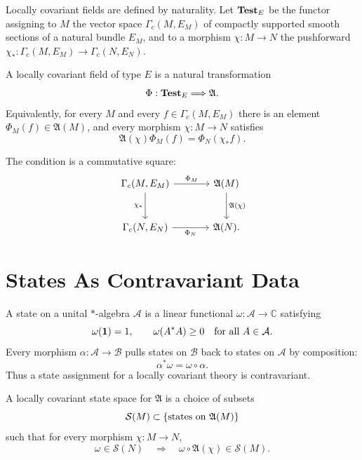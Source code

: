 Locally covariant fields are defined by naturality.  Let
\({\bf Test}_E\) be the functor assigning to \(M\) the vector space
\(\Gamma_c(M,E_M)\) of compactly supported smooth sections of a natural
bundle \(E_M\), and to a morphism \(\chi:M\to N\) the pushforward
\(\chi_*:\Gamma_c(M,E_M)\to\Gamma_c(N,E_N)\).

\begin{definition}
\label{def:locally-covariant-field}
A locally covariant field of type \(E\) is a natural transformation
\[
  \Phi:{\bf Test}_E\Longrightarrow \mathfrak A .
\]
Equivalently, for every \(M\) and every \(f\in\Gamma_c(M,E_M)\) there is an
element \(\Phi_M(f)\in\mathfrak A(M)\), and every morphism
\(\chi:M\to N\) satisfies
\begin{equation}
  \mathfrak A(\chi)\Phi_M(f)=\Phi_N(\chi_*f).
  \label{eq:locally-covariant-field-naturality}
\end{equation}
\end{definition}

The condition is a commutative square:
\[
\begin{tikzcd}[column sep=large,row sep=large]
  \Gamma_c(M,E_M) \arrow[r,"\Phi_M"] \arrow[d,"\chi_*"']
  & \mathfrak A(M) \arrow[d,"\mathfrak A(\chi)"]\\
  \Gamma_c(N,E_N) \arrow[r,"\Phi_N"']
  & \mathfrak A(N).
\end{tikzcd}
\]

\section{States As Contravariant Data}

A state on a unital \(\ast\)-algebra \(\mathcal A\) is a linear functional
\(\omega:\mathcal A\to\mathbb C\) satisfying
\[
  \omega(\mathbf 1)=1,
  \qquad
  \omega(A^*A)\ge0
  \quad\hbox{for all }A\in\mathcal A .
\]
Every morphism \(\alpha:\mathcal A\to\mathcal B\) pulls states on
\(\mathcal B\) back to states on \(\mathcal A\) by composition:
\[
  \alpha^*\omega=\omega\circ\alpha .
\]
Thus a state assignment for a locally covariant theory is contravariant.

\begin{definition}
\label{def:locally-covariant-state-space}
A locally covariant state space for \(\mathfrak A\) is a choice of subsets
\[
  \mathcal S(M)\subset \{\hbox{states on }\mathfrak A(M)\}
\]
such that for every morphism \(\chi:M\to N\),
\[
  \omega\in\mathcal S(N)
  \quad\Longrightarrow\quad
  \omega\circ\mathfrak A(\chi)\in\mathcal S(M).
\]
\end{definition}

